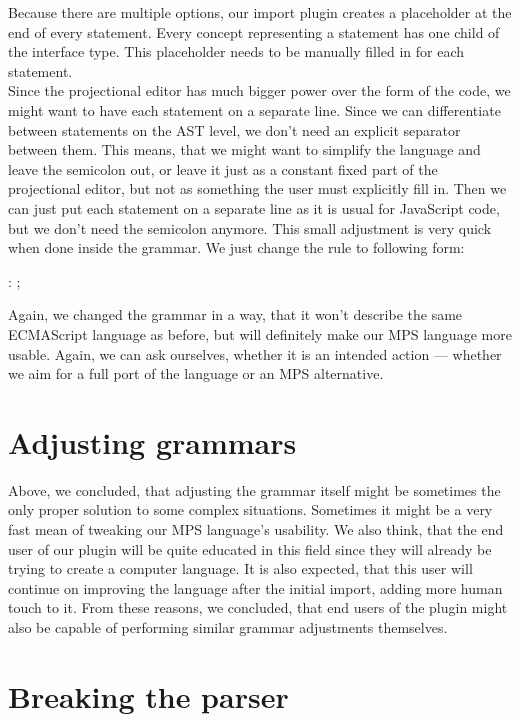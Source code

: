 Because there are multiple options, our import plugin creates a placeholder at the end of every statement.
Every concept representing a statement has one child of the  interface type.
This placeholder needs to be manually filled in for each statement.
\\

Since the projectional editor has much bigger power over the form of the code, we might want to have each statement on a separate line.
Since we can differentiate between statements on the AST level, we don't need an explicit separator between them.
This means, that we might want to simplify the language and leave the semicolon out, or leave it just as a constant fixed part of the projectional editor, but not as something the user must explicitly fill in.
Then we can just put each statement on a separate line as it is usual for JavaScript code, but we don't need the semicolon anymore.
This small adjustment is very quick when done inside the grammar.
We just change the  rule to following form:

\begin{antlr}
	 : \literal{;} ;
\end{antlr}

Again, we changed the grammar in a way, that it won't describe the same ECMAScript language as before, but will definitely make our MPS language more usable.
Again, we can ask ourselves, whether it is an intended action --- whether we aim for a full port of the language or an MPS alternative.

\section{Adjusting grammars}
Above, we concluded, that adjusting the grammar itself might be sometimes the only proper solution to some complex situations.
Sometimes it might be a very fast mean of tweaking our MPS language's usability.
We also think, that the end user of our plugin will be quite educated in this field since they will already be trying to create a computer language.
It is also expected, that this user will continue on improving the language after the initial import, adding more human touch to it.
From these reasons, we concluded, that end users of the plugin might also be capable of performing similar grammar adjustments themselves.

\section{Breaking the parser}
\label{chap:breaking_the_parser}

